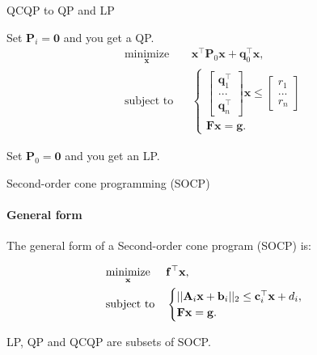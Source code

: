 \documentclass{beamer}
\begin{document}
\begin{frame}{QCQP to QP and LP}
\begin{flushleft}

Set $\mathbf{P}_i = \mathbf{0}$ and you get a QP.
%
\begin{equation}
\begin{aligned}
& \underset{\mathbf{x}}{\text{minimize}}
& & \mathbf{x}^\top \mathbf{P}_0 \mathbf{x} + \mathbf{q}_0^\top\mathbf{x}, \\
& \text{subject to}
& & \begin{cases}
    \begin{bmatrix} 
    \mathbf{q}_1^\top \\ ... \\ \mathbf{q}_n^\top
    \end{bmatrix} 
    \mathbf{x} \leq
    \begin{bmatrix} 
    r_1 \\ ... \\ r_n
    \end{bmatrix} \\
    \mathbf{F}\mathbf{x} = \mathbf{g}.
    \end{cases}
\end{aligned}
\end{equation}

Set $\mathbf{P}_0 = \mathbf{0}$ and you get an LP.

\end{flushleft}
\end{frame}




\begin{frame}{Second-order cone programming (SOCP)}
\framesubtitle{General form}
\begin{flushleft}


The general form of a Second-order cone program (SOCP) is:

%
\begin{equation}
\begin{aligned}
& \underset{\mathbf{x}}{\text{minimize}}
& & \mathbf{f}^\top\mathbf{x}, \\
& \text{subject to}
& & \begin{cases}
    ||\mathbf{A}_i\mathbf{x} + \mathbf{b}_i||_2 \leq 
     \mathbf{c}_i^\top \mathbf{x} + d_i, \\
    \mathbf{F}\mathbf{x} = \mathbf{g}.
    \end{cases}
\end{aligned}
\end{equation}

LP, QP and QCQP are subsets of SOCP.
 
\end{flushleft}
\end{frame}
\end{document}
